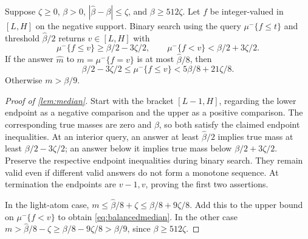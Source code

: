 \begin{lemma}\label{lem:median}
Suppose $\zeta\ge0$, $\beta>0$, $|\widehat\beta-\beta|\le\zeta$, and $\beta\ge512\zeta$. Let $f$ be integer-valued in $[L,H]$ on the negative support. Binary search using the query $\mu^-\{f\le t\}$ and threshold $\widehat\beta/2$ returns $v\in[L,H]$ with
\[
 \mu^-\{f\le v\}\ge\beta/2-3\zeta/2,
 \qquad
 \mu^-\{f<v\}<\beta/2+3\zeta/2.
\]
If the answer $\widehat m$ to $m=\mu^-\{f=v\}$ is at most $\widehat\beta/8$, then
\begin{equation}\label{eq:balancedmedian}
 \beta/2-3\zeta/2\le\mu^-\{f\le v\}
 <5\beta/8+21\zeta/8.
\end{equation}
Otherwise $m>\beta/9$.
\end{lemma}

\begin{proof}[Proof of \cref{lem:median}]
Start with the bracket $[L-1,H]$, regarding the lower endpoint as a negative comparison and the upper as a positive comparison. The corresponding true masses are zero and $\beta$, so both satisfy the claimed endpoint inequalities. At an interior query, an answer at least $\widehat\beta/2$ implies true mass at least $\beta/2-3\zeta/2$; an answer below it implies true mass below $\beta/2+3\zeta/2$. Preserve the respective endpoint inequalities during binary search. They remain valid even if different valid answers do not form a monotone sequence. At termination the endpoints are $v-1,v$, proving the first two assertions.

In the light-atom case, $m\le\widehat\beta/8+\zeta\le\beta/8+9\zeta/8$. Add this to the upper bound on $\mu^-\{f<v\}$ to obtain \eqref{eq:balancedmedian}. In the other case $m>\widehat\beta/8-\zeta\ge\beta/8-9\zeta/8>\beta/9$, since $\beta\ge512\zeta$.
\end{proof}
